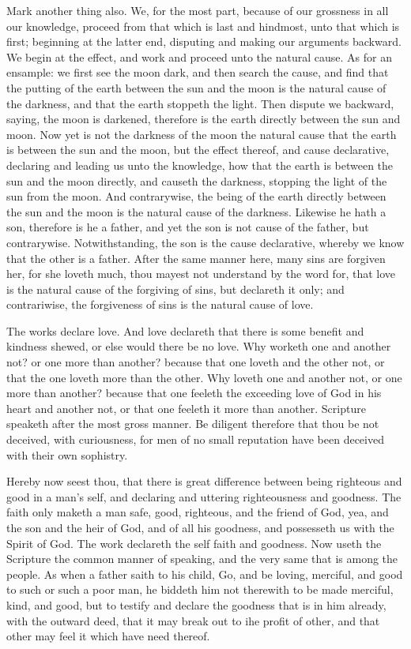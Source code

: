Mark another thing also. We, for the most part, because 
of our grossness in all our knowledge, proceed from that which 
is last and hindmost, unto that which is first; beginning at 
the latter end, disputing and making our arguments backward.
We begin at the effect, and work and proceed unto 
the natural cause. As for an ensample: we first see the moon 
dark, and then search the cause, and find that the putting of 
the earth between the sun and the moon is the natural cause 
of the darkness, and that the earth stoppeth the light. Then 
dispute we backward, saying, the moon is darkened, therefore
is the earth directly between the sun and moon. Now 
yet is not the darkness of the moon the natural cause that 
the earth is between the sun and the moon, but the effect 
thereof, and cause declarative, declaring and leading us 
unto the knowledge, how that the earth is between the sun 
and the moon directly, and causeth the darkness, stopping 
the light of the sun from the moon. And contrarywise, the 
being of the earth directly between the sun and the moon 
is the natural cause of the darkness. Likewise he hath a son, 
therefore is he a father, and yet the son is not cause of the 
father, but contrarywise. Notwithstanding, the son is the 
cause declarative, whereby we know that the other is a 
father. After the same manner here, many sins are forgiven
her, for she loveth much, thou mayest not understand 
by the word for, that love is the natural cause of the forgiving
of sins, but declareth it only; and contrariwise, the 
forgiveness of sins is the natural cause of love. 

The works declare love. And love declareth that there is 
some benefit and kindness shewed, or else would there be 
no love. Why worketh one and another not? or one more 
than another? because that one loveth and the other not, or 
that the one loveth more than the other. Why loveth one 
and another not, or one more than another? because that 
one feeleth the exceeding love of God in his heart and another
not, or that one feeleth it more than another. Scripture speaketh
after the most gross manner. Be diligent therefore
that thou be not deceived, with curiousness, for men of no 
small reputation have been deceived with their own sophistry. 


Hereby now seest thou, that there is great difference 
between being righteous and good in a man's self, and declaring
and uttering righteousness and goodness. The 
faith only maketh a man safe, good, righteous, and the 
friend of God, yea, and the son and the heir of God, and of 
all his goodness, and possesseth us with the Spirit of God.
The work declareth the self faith and goodness. Now
useth the Scripture the common manner of speaking,
and the very same that is among the people. As when a father
saith to his child, Go, and be loving, merciful, and good 
to such or such a poor man, he biddeth him not therewith 
to be made merciful, kind, and good, but to testify and 
declare the goodness that is in him already, with the outward
deed, that it may break out to ihe profit of other, and 
that other may feel it which have need thereof. 

